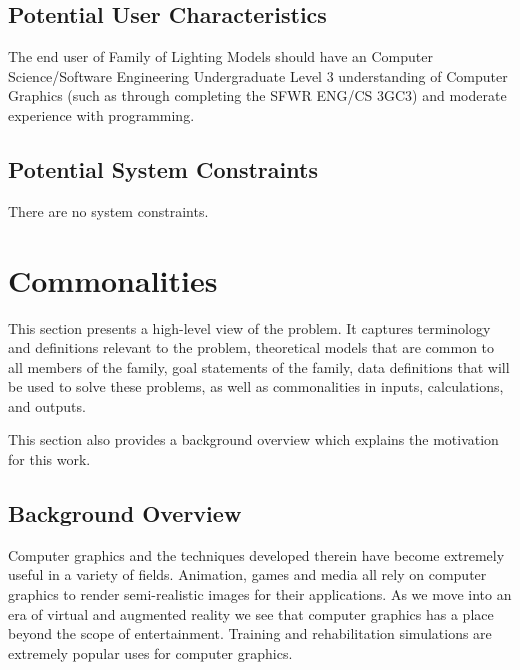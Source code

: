 \documentclass[12pt]{article}
\newcommand{\famname}{Family of Lighting Models} %
\begin{document}
\subsection{Potential User Characteristics} \label{SecUserCharacteristics}
The end user of \famname{} should have an Computer Science/Software Engineering 
Undergraduate Level 3 understanding of Computer Graphics (such as through 
completing the SFWR ENG/CS 3GC3) and moderate experience with programming.

\subsection{Potential System Constraints}
There are no system constraints.

%
%

\section{Commonalities}
This section presents a high-level view of the problem. It captures terminology 
and definitions relevant to the problem, theoretical models that are common to 
all members of the family, goal statements of the family, data definitions that 
will be used to solve these problems, as well as commonalities in inputs, 
calculations, and outputs.

This section also provides a background overview which explains the motivation 
for this work.

\subsection{Background Overview} \label{Sec_Background}
Computer graphics and the techniques developed therein have become extremely 
useful in a variety of fields. Animation, games and media all rely on computer 
graphics to render semi-realistic images for their applications. As we move 
into an era of virtual and augmented reality we see that computer graphics has 
a place beyond the scope of entertainment. Training and rehabilitation 
simulations are extremely popular uses for computer graphics.
\end{document}
